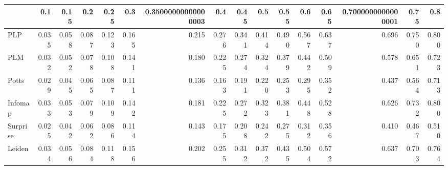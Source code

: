 \begin{tabular}{lrrrrrrrrrrrrrrr}
\toprule
{} &   0.1 &  0.15 &   0.2 &  0.25 &   0.3 & 0.35000000000000003 &   0.4 &  0.45 &   0.5 &  0.55 &   0.6 &  0.65 & 0.7000000000000001 &  0.75 &   0.8 \\
\midrule
PLP      & 0.035 & 0.058 & 0.087 & 0.123 & 0.165 &               0.215 & 0.276 & 0.341 & 0.414 & 0.490 & 0.567 & 0.637 &              0.696 & 0.750 & 0.800 \\
PLM      & 0.032 & 0.052 & 0.078 & 0.108 & 0.141 &               0.180 & 0.225 & 0.274 & 0.324 & 0.379 & 0.442 & 0.509 &              0.578 & 0.651 & 0.723 \\
Potts    & 0.029 & 0.045 & 0.065 & 0.087 & 0.111 &               0.136 & 0.163 & 0.191 & 0.220 & 0.253 & 0.295 & 0.352 &              0.437 & 0.564 & 0.713 \\
Infomap  & 0.033 & 0.053 & 0.079 & 0.109 & 0.142 &               0.181 & 0.225 & 0.272 & 0.323 & 0.381 & 0.448 & 0.528 &              0.626 & 0.732 & 0.800 \\
Surprise & 0.025 & 0.042 & 0.062 & 0.086 & 0.114 &               0.143 & 0.175 & 0.208 & 0.242 & 0.275 & 0.312 & 0.356 &              0.410 & 0.467 & 0.510 \\
Leiden   & 0.034 & 0.056 & 0.084 & 0.118 & 0.156 &               0.202 & 0.255 & 0.312 & 0.372 & 0.435 & 0.504 & 0.572 &              0.637 & 0.703 & 0.764 \\
\bottomrule
\end{tabular}
